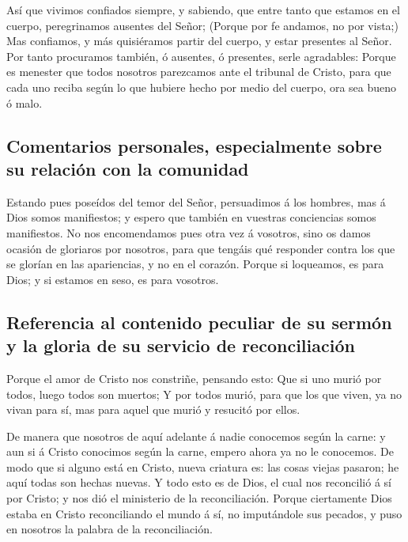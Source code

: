  Así que vivimos confiados siempre, y sabiendo, que entre
tanto que estamos en el cuerpo, peregrinamos ausentes del Señor;
 (Porque por fe andamos, no por vista;)  Mas
confiamos, y más quisiéramos partir del cuerpo, y estar presentes al
Señor.  Por tanto procuramos también, ó ausentes, ó
presentes, serle agradables:  Porque es menester que
todos nosotros parezcamos ante el tribunal de Cristo, para que cada uno
reciba según lo que hubiere hecho por medio del cuerpo, ora sea bueno ó
malo.

\hypertarget{comentarios-personales-especialmente-sobre-su-relaciuxf3n-con-la-comunidad}{%
\subsection{Comentarios personales, especialmente sobre su relación con
la
comunidad}\label{comentarios-personales-especialmente-sobre-su-relaciuxf3n-con-la-comunidad}}

 Estando pues poseídos del temor del Señor, persuadimos á
los hombres, mas á Dios somos manifiestos; y espero que también en
vuestras conciencias somos manifiestos.  No nos
encomendamos pues otra vez á vosotros, sino os damos ocasión de
gloriaros por nosotros, para que tengáis qué responder contra los que se
glorían en las apariencias, y no en el corazón.  Porque
si loqueamos, es para Dios; y si estamos en seso, es para vosotros.

\hypertarget{referencia-al-contenido-peculiar-de-su-sermuxf3n-y-la-gloria-de-su-servicio-de-reconciliaciuxf3n}{%
\subsection{Referencia al contenido peculiar de su sermón y la gloria de
su servicio de
reconciliación}\label{referencia-al-contenido-peculiar-de-su-sermuxf3n-y-la-gloria-de-su-servicio-de-reconciliaciuxf3n}}

 Porque el amor de Cristo nos constriñe, pensando esto:
Que si uno murió por todos, luego todos son muertos;  Y
por todos murió, para que los que viven, ya no vivan para sí, mas para
aquel que murió y resucitó por ellos.

 De manera que nosotros de aquí adelante á nadie
conocemos según la carne: y aun si á Cristo conocimos según la carne,
empero ahora ya no le conocemos.  De modo que si alguno
está en Cristo, nueva criatura es: las cosas viejas pasaron; he aquí
todas son hechas nuevas.  Y todo esto es de Dios, el cual
nos reconcilió á sí por Cristo; y nos dió el ministerio de la
reconciliación.  Porque ciertamente Dios estaba en Cristo
reconciliando el mundo á sí, no imputándole sus pecados, y puso en
nosotros la palabra de la reconciliación.

